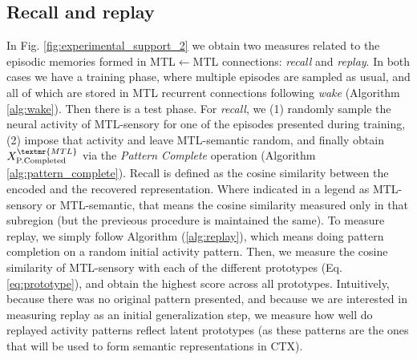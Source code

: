 \documentclass{article}
\begin{document}
\subsection*{Recall and replay}
In Fig. \ref{fig:experimental_support_2} we obtain two measures related to the episodic memories formed in MTL$\leftarrow$MTL connections: \textit{recall} and \textit{replay}. In both cases we have a training phase, where multiple episodes are sampled as usual, and all of which are stored in MTL recurrent connections following \textit{wake} (Algorithm \ref{alg:wake}). Then there is a test phase. For \textit{recall}, we (1) randomly sample the neural activity of MTL-sensory for one of the episodes presented during training, (2) impose that activity and leave MTL-semantic random, and finally obtain $X^\textmr{MTL}_\textrm{P.Completed}$ via the \textit{Pattern Complete} operation (Algorithm \ref{alg:pattern_complete}). Recall is defined as the cosine similarity between the encoded and the recovered representation. Where indicated in a legend as MTL-sensory or MTL-semantic, that means the cosine similarity measured only in that subregion (but the previeous procedure is maintained the same). To measure  replay, we simply follow Algorithm (\ref{alg:replay}), which means doing pattern completion on a random initial activity pattern. Then, we measure the cosine similarity of MTL-sensory with each of the different prototypes (Eq. \eqref{eq:prototype}), and obtain the highest score across all prototypes. Intuitively, because there was no original pattern presented, and because we are interested in measuring replay as an initial generalization step, we measure how well do replayed activity patterns reflect latent prototypes (as these patterns are the ones that will be used to form semantic representations in CTX).
\end{document}

